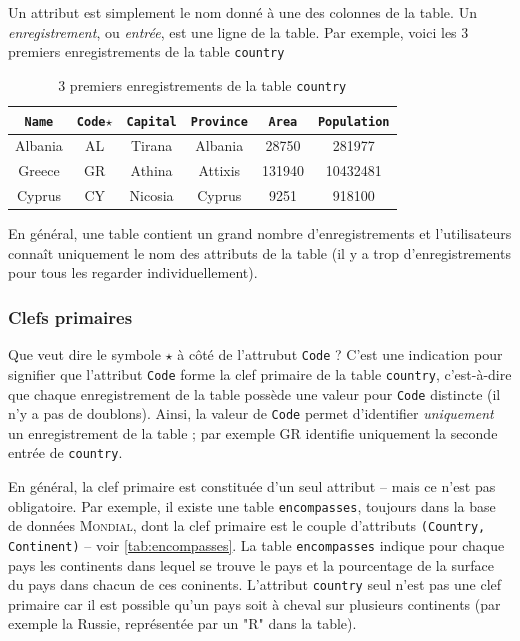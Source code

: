 Un attribut est simplement le nom donné à une des colonnes de la table. Un \textit{enregistrement}, ou \textit{entrée}, est une ligne de la table. Par exemple, voici les 3 premiers enregistrements de la table \texttt{country}
\begin{table}[h!]
	\centering
	\begin{tabular}{|cccccc|}
		\hline
		\texttt{Name} & \texttt{Code}$ \star $ & \texttt{Capital} & \texttt{Province} & \texttt{Area} & \texttt{Population} \\ \hline
		Albania       & AL                     & Tirana           & Albania           & 28750         & 281977              \\
		Greece        & GR                     & Athina           & Attixis           & 131940        & 10432481            \\
		Cyprus        & CY                     & Nicosia          & Cyprus            & 9251          & 918100              \\ \hline
	\end{tabular}
	\caption{3 premiers enregistrements de la table \texttt{country} }
	\label{tab:first-of-country}
\end{table}

En général, une table contient un grand nombre d'enregistrements et l'utilisateurs connaît uniquement le nom des attributs de la table (il y a trop d'enregistrements pour tous les regarder individuellement).

\subsubsection*{Clefs primaires}
Que veut dire le symbole $ \star $ à côté de l'attrubut \texttt{Code} ? C'est une indication pour signifier que l'attribut \texttt{Code} forme la clef primaire de la table \texttt{country}, c'est-à-dire que chaque enregistrement de la table possède une valeur pour \texttt{Code} distincte (il n'y a pas de doublons). Ainsi, la valeur de \texttt{Code} permet d'identifier \textit{uniquement} un enregistrement de la table ; par exemple GR identifie uniquement la seconde entrée de \texttt{country}.

En général, la clef primaire est constituée d'un seul attribut -- mais ce n'est pas obligatoire. Par exemple, il existe une table \texttt{encompasses}, toujours dans la base de données \textsc{Mondial}, dont la clef primaire est le couple d'attributs \texttt{(Country, Continent)} -- voir \autoref{tab:encompasses}. La table \texttt{encompasses} indique pour chaque pays les continents dans lequel se trouve le pays et la pourcentage de la surface du pays dans chacun de ces coninents. L'attribut \texttt{country} seul n'est pas une clef primaire car il est possible qu'un pays soit à cheval sur plusieurs continents (par exemple la Russie, représentée par un "R" dans la table).


